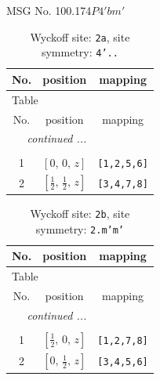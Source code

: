 \documentclass[fleqn,8pt]{jsarticle}
\begin{document}
\setcounter{MaxMatrixCols}{32}

\renewcommand{\tablename}{Table~}
\renewcommand{\figurename}{Figure~}
\begin{center}
\LARGE
MSG No. 100.174\quad$P4'bm'$
\end{center}
\renewcommand{\arraystretch}{1.2}
\begin{longtable}{ccc}
\caption{Wyckoff site: {\tt 2a}, site symmetry: {\tt 4'..}}
 \\
 \hline \hline
No. & position & mapping \\ \hline \endfirsthead

\multicolumn{2}{l}{\tablename\ \thetable{}} \\
 \hline \hline
No. & position & mapping \\ \hline \endhead

 \hline \hline
\multicolumn{2}{r}{\footnotesize\it continued ...} \\ \endfoot

 \hline \hline
\multicolumn{2}{r}{} \\ \endlastfoot

1 & $\left[ 0,\, 0,\, z \right]$ & {\tt [1,2,5,6]} \\ \hline
2 & $\left[ \frac{1}{2},\, \frac{1}{2},\, z \right]$ & {\tt [3,4,7,8]} \\
\end{longtable}
\renewcommand{\arraystretch}{1.2}
\begin{longtable}{ccc}
\caption{Wyckoff site: {\tt 2b}, site symmetry: {\tt 2.m'm'}}
 \\
 \hline \hline
No. & position & mapping \\ \hline \endfirsthead

\multicolumn{2}{l}{\tablename\ \thetable{}} \\
 \hline \hline
No. & position & mapping \\ \hline \endhead

 \hline \hline
\multicolumn{2}{r}{\footnotesize\it continued ...} \\ \endfoot

 \hline \hline
\multicolumn{2}{r}{} \\ \endlastfoot

1 & $\left[ \frac{1}{2},\, 0,\, z \right]$ & {\tt [1,2,7,8]} \\ \hline
2 & $\left[ 0,\, \frac{1}{2},\, z \right]$ & {\tt [3,4,5,6]} \\
\end{longtable}
\renewcommand{\arraystretch}{1.2}
\end{document}

